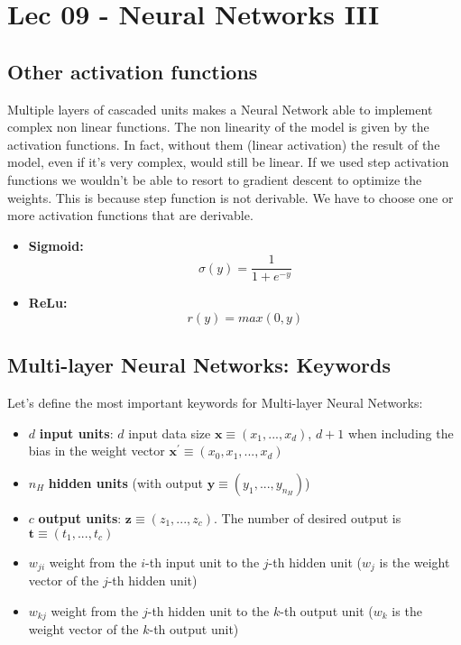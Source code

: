 \chapter{Lec 09 - Neural Networks III}

\section{Other activation functions}
Multiple layers of cascaded units makes a Neural Network able to implement complex non linear functions. The non linearity of the model is given by the activation functions. In fact, without them (linear activation) the result of the model, even if it’s very complex, would still be linear. If we used step activation functions we wouldn't be able to resort to gradient descent to optimize the weights. This is because step function is not derivable. We have to choose one or more activation functions that are derivable.
\begin{itemize}
    \item \textbf{Sigmoid:}
    \[\sigma(y) = \frac{1}{1 + e^{-y}}\]

    \item \textbf{ReLu:}
    \[r(y) = max(0, y)\]
\end{itemize}
\section{Multi-layer Neural Networks: Keywords}
Let's define the most important keywords for Multi-layer Neural Networks:
\begin{itemize}
    \item $d$ \textbf{input units}: $d$ input data size $\textbf{x} \equiv (x_{1},...,x_{d})$, $d + 1$ when including the bias in the weight vector $\textbf{x}^{'} \equiv (x_{0}, x_{1},...,x_{d})$

    \item $n_{H}$ \textbf{hidden units} (with output $\textbf{y} \equiv (y_{1},...,y_{n_{H}})$)

    \item $c$ \textbf{output units}: $\textbf{z} \equiv (z_{1},...,z_{c})$. The number of desired output is $\textbf{t} \equiv (t_{1},...,t_{c})$

    \item $w_{ji}$ weight from the $i$-th input unit to the $j$-th hidden unit ($w_{j}$ is the weight vector of the $j$-th hidden unit)

    \item $w_{kj}$ weight from the $j$-th hidden unit to the $k$-th output unit ($w_{k}$ is the weight vector of the $k$-th output unit)
\end{itemize}
